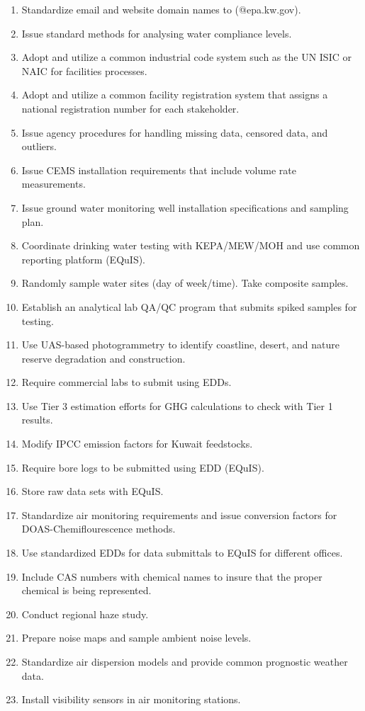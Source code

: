 \begin{enumerate}
\item Standardize email and website domain names to (@epa.kw.gov). 
\item Issue standard methods for analysing water compliance levels.
\item Adopt and utilize a common industrial code system such as the UN ISIC or NAIC for facilities processes.
\item Adopt and utilize a common facility registration system that assigns a national registration number for each stakeholder.
\item Issue agency procedures for handling missing data, censored data, and outliers.
\item Issue CEMS installation requirements that include volume rate measurements.
\item Issue ground water monitoring well installation specifications and sampling plan.
\item Coordinate drinking water testing with KEPA/MEW/MOH and use common reporting platform (EQuIS).
\item Randomly sample water sites (day of week/time). Take composite samples.
\item Establish an analytical lab QA/QC program that submits spiked samples for testing.
\item Use UAS-based photogrammetry to identify coastline, desert, and nature reserve degradation and construction.
\item Require commercial labs to submit using EDDs.
\item Use Tier 3 estimation efforts for GHG calculations to check with Tier 1 results.
\item Modify IPCC emission factors for Kuwait feedstocks.
\item Require bore logs to be submitted using EDD (EQuIS).
\item Store raw data sets with EQuIS.
\item Standardize air monitoring requirements and issue conversion factors for DOAS-Chemiflourescence methods.
\item Use standardized EDDs for data submittals to EQuIS for different offices.
\item Include CAS numbers with chemical names to insure that the proper chemical is being represented.
\item Conduct regional haze study.
\item Prepare noise maps and sample ambient noise levels.
\item Standardize air dispersion models and provide common prognostic weather data.
\item Install visibility sensors in air monitoring stations.
\end{enumerate}

